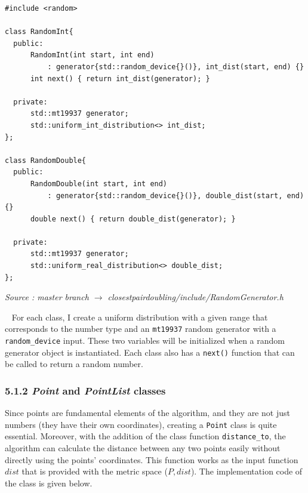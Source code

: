 \documentclass[12pt,english,]{article}
\newcommand{\code}[1]{\colorbox{light-gray}{\texttt{#1}}}
\begin{document}
\begin{lstlisting}
#include <random>

class RandomInt{
  public:
      RandomInt(int start, int end) 
          : generator{std::random_device{}()}, int_dist(start, end) {}
      int next() { return int_dist(generator); } 

  private:
      std::mt19937 generator;
      std::uniform_int_distribution<> int_dist;
};

class RandomDouble{
  public:
      RandomDouble(int start, int end) 
          : generator{std::random_device{}()}, double_dist(start, end) {}
      double next() { return double_dist(generator); } 

  private:
      std::mt19937 generator;
      std::uniform_real_distribution<> double_dist;
};
\end{lstlisting}
\vspace{-9truemm}
\begin{minipage}{1\textwidth}
  \begin{flushright}
  {\footnotesize \emph{Source \footnotemark: master branch $\rightarrow$ closestpairdoubling/include/RandomGenerator.h }\par}
  \end{flushright}
\end{minipage}
\vspace{0.5truemm}

~ For each class, I create a uniform distribution with a given range
that corresponds to the number type and an \code{mt19937} random
generator with a \code{random\_device} input. These two variables will
be initialized when a random generator object is instantiated. Each
class also has a \code{next()} function that can be called to return a
random number.

\hypertarget{section5.1.2}{%
\subsubsection{\texorpdfstring{5.1.2 \emph{Point} and \emph{PointList}
classes}{5.1.2  and  classes}}\label{section5.1.2}}

Since points are fundamental elements of the algorithm, and they are not
just numbers (they have their own coordinates), creating a \code{Point}
class is quite essential. Moreover, with the addition of the class
function \code{distance\_to}, the algorithm can calculate the distance
between any two points easily without directly using the points'
coordinates. This function works as the input function \(dist\) that is
provided with the metric space (\(P, dist\)). The implementation code of
the class is given below.
\end{document}
